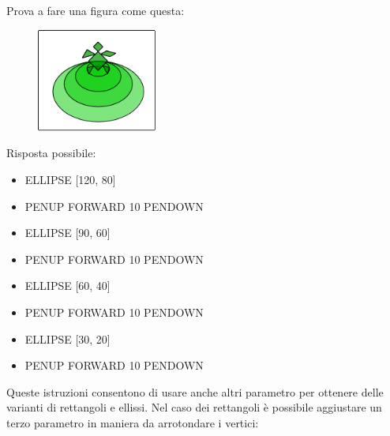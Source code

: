 \vskip 1cm

Prova a fare una figura come questa:

\vskip 1cm

\begin{figure}[H]
   \centering
   \includegraphics[width=4.0cm,trim=4 4 8 4,clip]{./images/disegnare/disegnare-24.png}
   \label{dis-23}
\end{figure}

\vskip 1cm
\pagebreak

Risposta possibile:

\vskip 1cm

\begin{scriptsize}
\begin{minipage}{0.40\textwidth}
\begin{itemize}[itemsep=-3pt,parsep=2pt]
\item[] ELLIPSE [120, 80] 
\item[] PENUP FORWARD 10 PENDOWN
\item[] ELLIPSE [90, 60]         
\item[] PENUP FORWARD 10 PENDOWN
\item[] ELLIPSE [60, 40] 
\item[] PENUP FORWARD 10 PENDOWN
\item[] ELLIPSE [30, 20] 
\item[] PENUP FORWARD 10 PENDOWN 
\end{itemize}
\end{minipage}
\end{scriptsize}

\vskip 1cm

Queste istruzioni consentono di usare anche altri parametro per ottenere delle varianti di rettangoli e ellissi. Nel caso dei rettangoli è possibile aggiustare un terzo parametro in maniera da arrotondare i vertici:

\vskip 1cm

